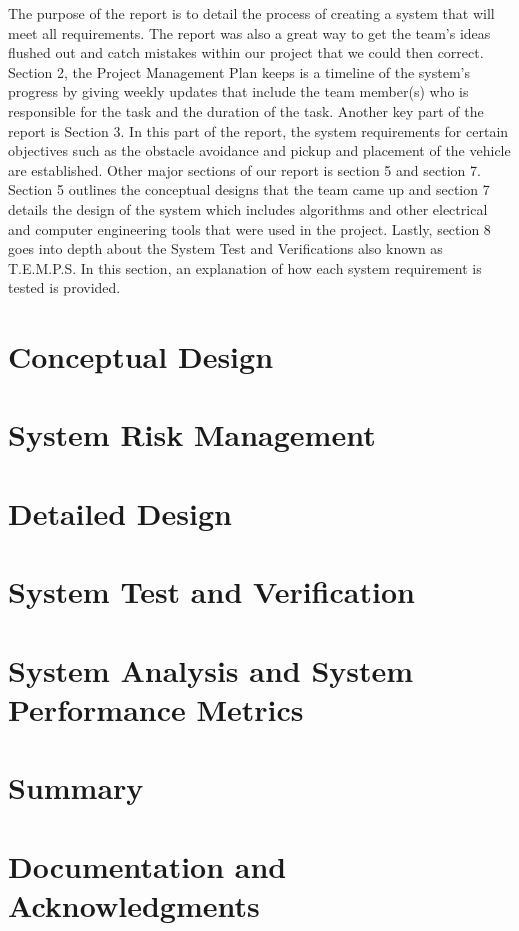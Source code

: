 \documentclass[11pt]{article}
\begin{document}
The purpose of the report is to detail the process of creating a system that will meet all requirements. The report was also a great way to get the team’s ideas flushed out and catch mistakes within our project that we could then correct. Section 2, the Project Management Plan keeps is a timeline of the system’s progress by giving weekly updates that include the team member(s) who is responsible for the task and the duration of the task. Another key part of the report is Section 3. In this part of the report, the system requirements for certain objectives such as the obstacle avoidance and pickup and placement of the vehicle are established. Other major sections of our report is section 5 and section 7. Section 5 outlines the conceptual designs that the team came up and section 7 details the design of the system which includes algorithms and other electrical and computer engineering tools that were used in the project. Lastly, section 8 goes into depth about the System Test and Verifications also known as T.E.M.P.S.
In this section, an explanation of how each system requirement is tested is provided. 




\section{Conceptual Design}
\section{System Risk Management}
\section{Detailed Design}
\section{System Test and Verification}
\section{System Analysis and System Performance Metrics}
\section{Summary}
\section{Documentation and Acknowledgments}
\newpage
\end{document}
